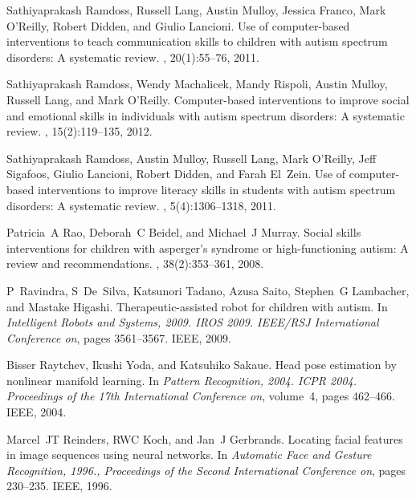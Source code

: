 \documentclass{ut-thesis}
\begin{document}
\begin{thebibliography}{100}
Sathiyaprakash Ramdoss, Russell Lang, Austin Mulloy, Jessica Franco, Mark
  O’Reilly, Robert Didden, and Giulio Lancioni.
\newblock Use of computer-based interventions to teach communication skills to
  children with autism spectrum disorders: A systematic review.
, 20(1):55--76, 2011.

Sathiyaprakash Ramdoss, Wendy Machalicek, Mandy Rispoli, Austin Mulloy, Russell
  Lang, and Mark O'Reilly.
\newblock Computer-based interventions to improve social and emotional skills
  in individuals with autism spectrum disorders: A systematic review.
, 15(2):119--135, 2012.

Sathiyaprakash Ramdoss, Austin Mulloy, Russell Lang, Mark O’Reilly, Jeff
  Sigafoos, Giulio Lancioni, Robert Didden, and Farah El~Zein.
\newblock Use of computer-based interventions to improve literacy skills in
  students with autism spectrum disorders: A systematic review.
, 5(4):1306--1318, 2011.

Patricia~A Rao, Deborah~C Beidel, and Michael~J Murray.
\newblock Social skills interventions for children with asperger’s syndrome
  or high-functioning autism: A review and recommendations.
, 38(2):353--361,
  2008.

P~Ravindra, S~De~Silva, Katsunori Tadano, Azusa Saito, Stephen~G Lambacher, and
  Mastake Higashi.
\newblock Therapeutic-assisted robot for children with autism.
\newblock In {\em Intelligent Robots and Systems, 2009. IROS 2009. IEEE/RSJ
  International Conference on}, pages 3561--3567. IEEE, 2009.

Bisser Raytchev, Ikushi Yoda, and Katsuhiko Sakaue.
\newblock Head pose estimation by nonlinear manifold learning.
\newblock In {\em Pattern Recognition, 2004. ICPR 2004. Proceedings of the 17th
  International Conference on}, volume~4, pages 462--466. IEEE, 2004.

Marcel~JT Reinders, RWC Koch, and Jan~J Gerbrands.
\newblock Locating facial features in image sequences using neural networks.
\newblock In {\em Automatic Face and Gesture Recognition, 1996., Proceedings of
  the Second International Conference on}, pages 230--235. IEEE, 1996.


\end{thebibliography}
\end{document}
